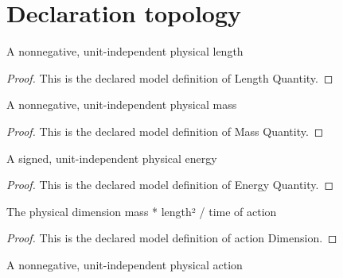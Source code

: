 \section{Declaration topology}
\begin{definition}
  \label{def:physics:phyx-mini-0660:phyxminiproblems-problemphyxmini0660-lengthquantity}
  A nonnegative, unit-independent physical length
\end{definition}
\begin{proof}
  This is the declared model definition of Length Quantity.
\end{proof}
\begin{definition}
  \label{def:physics:phyx-mini-0660:phyxminiproblems-problemphyxmini0660-massquantity}
  A nonnegative, unit-independent physical mass
\end{definition}
\begin{proof}
  This is the declared model definition of Mass Quantity.
\end{proof}
\begin{definition}
  \label{def:physics:phyx-mini-0660:phyxminiproblems-problemphyxmini0660-energyquantity}
  A signed, unit-independent physical energy
\end{definition}
\begin{proof}
  This is the declared model definition of Energy Quantity.
\end{proof}
\begin{definition}
  \label{def:physics:phyx-mini-0660:phyxminiproblems-problemphyxmini0660-actiondimension}
  The physical dimension mass * length² / time of action
\end{definition}
\begin{proof}
  This is the declared model definition of action Dimension.
\end{proof}
\begin{definition}
  \label{def:physics:phyx-mini-0660:phyxminiproblems-problemphyxmini0660-actionquantity}
  A nonnegative, unit-independent physical action
\end{definition}
